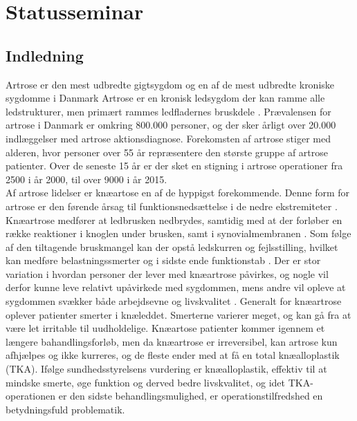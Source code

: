 
\raggedbottom



\chapter{Statusseminar}



\section{Indledning}
Artrose er den mest udbredte gigtsygdom og en af de mest udbredte kroniske sygdomme i Danmark 
Artrose er en kronisk ledsygdom der kan ramme alle ledstrukturer, men primært rammes ledfladernes bruskdele \citep{schroder}. Prævalensen for artrose i Danmark er omkring 800.000 personer, og der sker årligt over 20.000 indlæggelser med artrose aktionsdiagnose. \citep{sygdom}
Forekomsten af artrose stiger med alderen, hvor personer over 55 år repræsentere den største gruppe af artrose patienter. Over de seneste 15 år er der sket en stigning i artrose operationer fra 2500 i år 2000, til over 9000 i år 2015. \citep{aarsrapport2016} \\
Af artrose lidelser er knæartose en af de hyppigst forekommende. Denne form for artrose er den førende årsag til funktionsnedsættelse i de nedre ekstremiteter \cite{bezwick2012}. 
Knæartrose medfører at ledbrusken nedbrydes, samtidig med at der forløber en række reaktioner i knoglen under brusken, samt i synovialmembranen \citep{brostrom2012}. Som følge af den tiltagende bruskmangel kan der opstå ledskurren og fejlsstilling, hvilket kan medføre belastningssmerter og i sidste ende funktionstab \citep{ugeskrift2011}.
Der er stor variation i hvordan personer der lever med knæartrose påvirkes, og nogle vil derfor kunne leve relativt upåvirkede med sygdommen, mens andre vil opleve at sygdommen svækker både arbejdsevne og livskvalitet \citep{sygdom}.
Generalt for knæartrose oplever patienter smerter i knæleddet. Smerterne varierer meget, og kan gå fra at være let irritable til uudholdelige. Knæartose patienter kommer igennem et længere bahandlingsforløb, men da knæartrose er irreversibel, kan artrose kun afhjælpes og ikke kurreres, og de fleste ender med at få en total knæalloplastik (TKA). 
Ifølge sundhedsstyrelsens vurdering er knæalloplastik, effektiv til at mindske smerte, øge funktion og derved bedre livskvalitet, og idet TKA-operationen er den sidste behandlingsmulighed, er operationstilfredshed en betydningsfuld problematik. %
